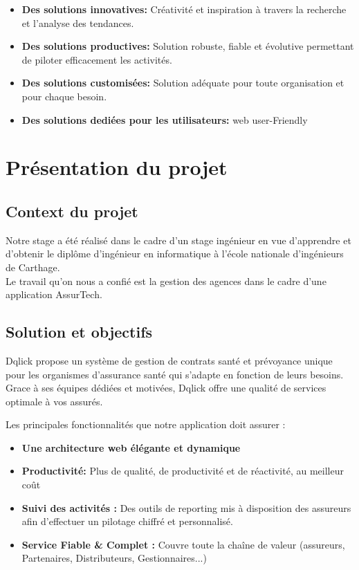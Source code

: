 \begin{itemize}[font=\normalsize]
\item\textbf{ Des solutions innovatives:} Créativité et inspiration à travers la recherche et l'analyse des tendances.

\item \textbf{Des solutions productives:} Solution robuste, fiable et évolutive permettant de piloter efficacement les activités.

\item \textbf{Des solutions customisées:} Solution adéquate pour toute organisation et pour chaque besoin.

\item \textbf{Des solutions dediées pour les utilisateurs:}  web
user-Friendly
\end{itemize}

\section{Pr\'esentation du projet }
\subsection{Context du projet}
Notre stage a été réalisé dans le cadre d'un stage ingénieur en vue d'apprendre et  d’obtenir  le diplôme d’ingénieur en informatique à l’école nationale d’ingénieurs de Carthage.\\
Le travail qu'on nous a confié est la gestion des agences dans le cadre d'une application AssurTech.




\subsection{Solution et objectifs }
Dqlick propose un système de gestion de contrats santé et prévoyance unique pour les
organismes d'assurance santé qui s'adapte en fonction de leurs besoins. Grace à ses équipes dédiées et motivées, Dqlick offre une qualité de services optimale à vos assurés.

\item Les principales fonctionnalités que notre application doit assurer :
\begin{itemize}[font=\normalsize]
\item\textbf {Une architecture web élégante et dynamique}
\item\textbf{Productivité: } Plus de qualité, de productivité et de réactivité, au meilleur coût
\item\textbf{Suivi des activités :}  Des outils de reporting mis à disposition des assureurs afin d’effectuer un pilotage chiffré et personnalisé.
\item\textbf{Service Fiable & Complet :} Couvre toute la chaîne de valeur (assureurs, Partenaires, Distributeurs, Gestionnaires...)
\end{itemize}

